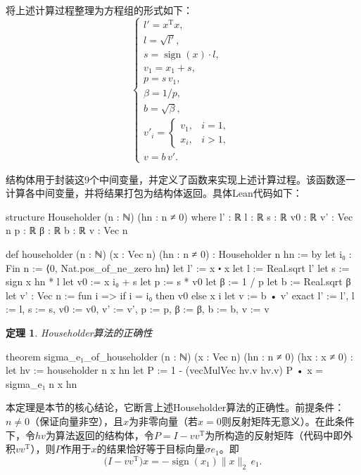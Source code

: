 ﻿\documentclass[UTF8,a4paper,openany]{ctexbook}
\DeclareMathOperator{\sign}{sign}
\theoremstyle{qrplain}
\newtheorem{theorem}[definition]{定理}
\begin{document}
将上述计算过程整理为方程组的形式如下：
$$
\left\{
\begin{array}{l}
l' = x^\mathrm{T}x, \\
l = \sqrt{l'}, \\
s = \sign(x)\cdot l, \\
v_1 = x_1 + s, \\
p = s\,v_1, \\
\beta = 1/p, \\
b = \sqrt{\beta}, \\
v'_i = \begin{cases}v_1, & i=1, \\ x_i, & i>1,\end{cases} \\
v = b\,v'.
\end{array}
\right.
$$

结构体用于封装这$9$个中间变量，并定义了函数来实现上述计算过程。该函数逐一计算各中间变量，并将结果打包为结构体返回。具体Lean代码如下：
\begin{leancode}
  structure Householder (n : ℕ) (hn : n ≠ 0) where
    l' : ℝ
    l : ℝ
    s : ℝ
    v0 : ℝ
    v' : Vec n
    p : ℝ
    β : ℝ
    b : ℝ
    v : Vec n

  def householder (n : ℕ) (x : Vec n) (hn : n ≠ 0) :
    Householder n hn := by
      let i₀ : Fin n := ⟨0, Nat.pos_of_ne_zero hn⟩
      let l' := x ⬝ x
      let l := Real.sqrt l'
      let s := sign x hn * l
      let v0 := x i₀ + s
      let p := s * v0
      let β := 1 / p
      let b := Real.sqrt β
      let v' : Vec n := fun i => if i = i₀ then v0 else x i
      let v := b • v'
      exact {l' := l', l := l, s := s, v0 := v0,
        v' := v', p := p, β := β, b := b, v := v
      }
\end{leancode}


\begin{theorem}
  Householder算法的正确性
\end{theorem}
\begin{leancode}
  theorem sigma_e₁_of_householder
    (n : ℕ)
    (x : Vec n)
    (hn : n ≠ 0)
    (hx : x ≠ 0) :
      let hv := householder n x hn
      let P := 1 - (vecMulVec hv.v hv.v)
        P • x = sigma_e₁ n x hn
\end{leancode}

本定理是本节的核心结论，它断言上述Householder算法的正确性。前提条件：$n\neq0$（保证向量非空），且$x$为非零向量（若$x=0$则反射矩阵无意义）。在此条件下，令$hv$为算法返回的结构体，令$P = I - vv^\mathrm{T}$为所构造的反射矩阵（代码中即外积$vv^\mathrm{T}$），则$P$作用于$x$的结果恰好等于目标向量$\sigma e_1$。即
$$
\bigl(I - vv^\mathrm{T}\bigr)x = -\sign(x_1)\|x\|_2\,e_1.
$$
\end{document}
